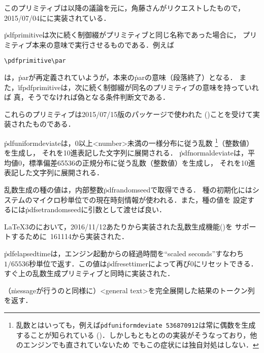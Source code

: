 \documentclass[a4paper,11pt,nomag,dvipdfmx]{jsarticle}
\begin{document}
\begin{cslist}
  このプリミティブは\cite{xe5}以降の議論を元に，角藤さんがリクエストしたもので，
  2015/07/04に\epTeX に実装されている．

  \.{pdfprimitive}は次に続く制御綴がプリミティブと同じ名称であった場合に，
  プリミティブ本来の意味で実行させるものである．例えば
\begin{verbatim}
\pdfprimitive\par
\end{verbatim}
  は，\.{par}が再定義されていようが，本来の\.{par}の意味（段落終了）となる．
  また，\.{ifpdfprimitive}は，次に続く制御綴が同名のプリミティブの意味を持っていれば
  真，そうでなければ偽となる条件判断文である．

  これらのプリミティブは2015/07/15版のパッケージで使われた
  (\cite{15715})ことを受けて実装されたものである．

  \.{pdfuniformdeviate}は，0以上<number>未満の一様分布に従う乱数
  \footnote{%
    乱数とはいっても，例えば\texttt{\.{pdfuniformdeviate}~536870912}は常に偶数を生成することが知られている
    (\cite{xe4})．しかしもともとのの実装がそうなっており，他のエンジンでも直されていないため
    \epTeX でもこの症状には独自対処はしない．
  }（整数値）を生成し，
  それを10進表記した文字列に展開される．
  \.{pdfnormaldeviate}は，平均値0，標準偏差65536の正規分布に従う乱数（整数値）を生成し，
  それを10進表記した文字列に展開される．

  乱数生成の種の値は，内部整数\.{pdfrandomseed}で取得できる．
  種の初期化にはシステムのマイクロ秒単位での現在時刻情報が使われる．また，種の値を
  設定するには\.{pdfsetrandomseed}に引数として渡せば良い．

  \LaTeX3のにおいて，2016/11/12あたりから実装された乱数生成機能(\cite{random})を
  サポートするために\epTeX~161114から実装された．

  \.{pdfelapsedtime}は，エンジン起動からの経過時間を``scaled seconds''すなわち
  $1/65536$秒単位で返す．この値は\.{pdfresettimer}によって再び0にリセットできる．
  すぐ上の乱数生成プリミティブと同時に実装された．

  （\.{message}が行うのと同様に）<general text>を完全展開した結果のトークン列を返す．


\end{cslist}
\end{document}
